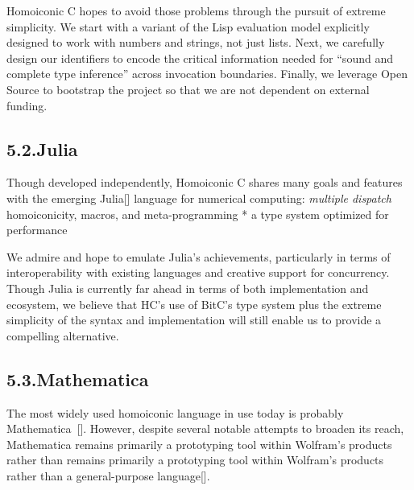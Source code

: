 \documentclass[preprint]{{acmart}}
\begin{document}
Homoiconic C hopes to avoid those problems through the pursuit of extreme
simplicity. We start with a variant of the Lisp evaluation model
explicitly designed to work with numbers and strings, not just lists.
Next, we carefully design our identifiers to encode the critical
information needed for \textquotedblleft{}sound and complete type inference\textquotedblright{} across
invocation boundaries. Finally, we leverage Open Source to bootstrap the
project so that we are not dependent on external funding.%

\subsection{5.2.\hspace*{0.5em}Julia}\label{sec-julia}%

\noindent{}Though developed  independently, Homoiconic C shares many goals and features
with the emerging Julia[] language for numerical computing:
\emph{ multiple dispatch
} homoiconicity, macros, and meta-programming
* a type system optimized for performance%

We admire and hope to emulate Julia's achievements, particularly in terms
of interoperability with existing languages and creative support for
concurrency. Though Julia is currently far ahead in terms of both
implementation and ecosystem, we believe that HC's use of BitC's type
system plus the extreme simplicity of the syntax and implementation will
still enable us to provide a compelling alternative.%

\subsection{5.3.\hspace*{0.5em}Mathematica}\label{sec-mathematica}%

\noindent{}The most widely used homoiconic language in use today is probably
Mathematica~{}[]. However, despite several notable attempts to
broaden its reach, Mathematica remains primarily a prototyping tool
within Wolfram's products rather than remains primarily a prototyping
tool within Wolfram's products rather than a general-purpose language[].%
\end{document}
